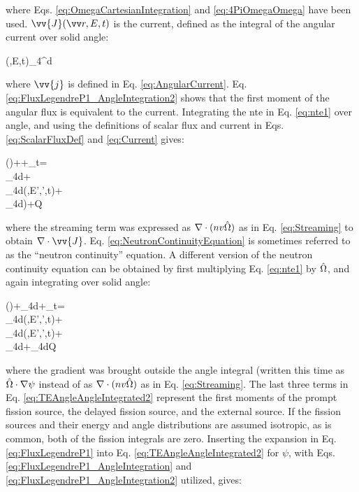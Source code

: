 where Eqs. \eqref{eq:OmegaCartesianIntegration} and \eqref{eq:4PiOmegaOmega} have been used. \(\vv{J}\sset\) is the current, defined as the integral of the angular current over solid angle:

\beq
\label{eq:Current}
(,E,t)\equiv\int_{4\pi}^{}d\hO  {}\seat
\eeq

where \(\vv{j}\) is defined in Eq. \eqref{eq:AngularCurrent}. Eq. \eqref{eq:FluxLegendreP1_AngleIntegration2} shows that the first moment of the angular flux is equivalent to the current. Integrating the \gls{nte} in Eq. \eqref{eq:nte1} over angle, and using the definitions of scalar flux and current in Eqs. \eqref{eq:ScalarFluxDef} and \eqref{eq:Current} gives:

\beqa
\label{eq:NeutronContinuityEquation}
\left(\right)+\nabla\cdot{}\sset+\Sigma_t\sset\phi\sset=\\
\int_{4\pi}d\hO\inscatteringsource\psi\seatout+\\
\int_{4\pi}d\hO\promptfissionsource\psi(,E',\hO',t)+\\
\int_{4\pi}d\hO\delayedfissionsource)+Q\sset
\eeqa

where the streaming term was expressed as \(\nabla\cdot(nv\hat{\Omega})\) as in Eq. \eqref{eq:Streaming} to obtain \(\nabla\cdot\vv{J}\). Eq. \eqref{eq:NeutronContinuityEquation} is sometimes referred to as the ``neutron continuity'' equation. A different version of the neutron continuity equation can be obtained by first multiplying Eq. \eqref{eq:nte1} by \(\hat{\Omega}\), and again integrating over solid angle:

\beqa
\label{eq:TEAngleAngleIntegrated2}
\left(\right)+\nabla\cdot\int_{4\pi}d\hO\psi\seat\hO\hO+\Sigma_t\sset{}\sset=\\
\int_{4\pi}d\hO\inscatteringsource\psi(,E',\hO',t)\hO+\\
\int_{4\pi}d\hO\promptfissionsource\psi(,E',\hO',t)\hO+\\
\int_{4\pi}d\hO\hO\delayedfissionsource+\int_{4\pi}d\hO Q\seat\hO
\eeqa

where the gradient was brought outside the angle integral (written this time as \(\hat{\Omega}\cdot\nabla\psi\) instead of as \(\nabla\cdot(nv\hat{\Omega})\) as in Eq. \eqref{eq:Streaming}. The last three terms in Eq. \eqref{eq:TEAngleAngleIntegrated2} represent the first moments of the prompt fission source, the delayed fission source, and the external source. If the fission sources and their energy and angle distributions are assumed isotropic, as is common, both of the fission integrals are zero. Inserting the expansion in Eq. \eqref{eq:FluxLegendreP1} into Eq. \eqref{eq:TEAngleAngleIntegrated2} for \(\psi\), with Eqs. \eqref{eq:FluxLegendreP1_AngleIntegration} and \eqref{eq:FluxLegendreP1_AngleIntegration2} utilized, gives:

